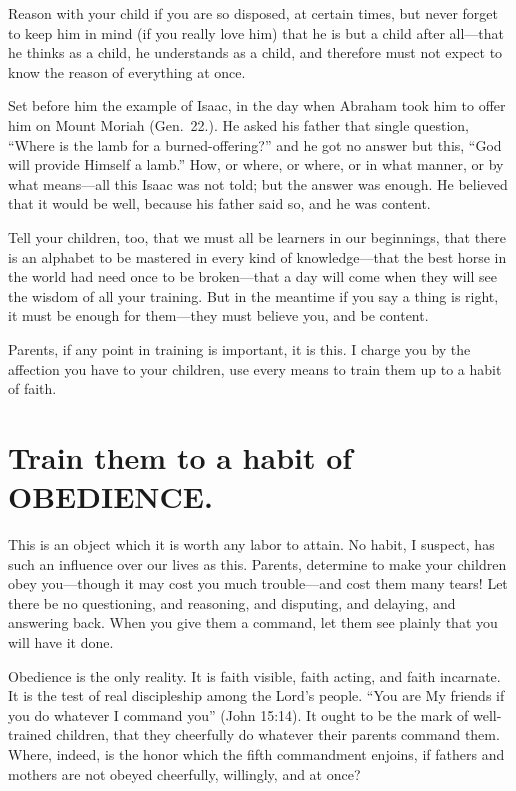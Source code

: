 \documentclass[
]{book}
\begin{document}
Reason with your child if you are so disposed, at certain times, but never forget to keep him in mind (if you really love him) that he is but a child after all---that he thinks as a child, he understands as a child, and therefore must not expect to know the reason of everything at once.

Set before him the example of Isaac, in the day when Abraham took him to offer him on Mount Moriah (Gen.~22.). He asked his father that single question, ``Where is the lamb for a burned-offering?'' and he got no answer but this, ``God will provide Himself a lamb.'' How, or where, or where, or in what manner, or by what means---all this Isaac was not told; but the answer was enough. He believed that it would be well, because his father said so, and he was content.

Tell your children, too, that we must all be learners in our beginnings, that there is an alphabet to be mastered in every kind of knowledge---that the best horse in the world had need once to be broken---that a day will come when they will see the wisdom of all your training. But in the meantime if you say a thing is right, it must be enough for them---they must believe you, and be content.

Parents, if any point in training is important, it is this. I charge you by the affection you have to your children, use every means to train them up to a habit of faith.

\hypertarget{train-them-to-a-habit-of-obedience.}{%
\chapter{Train them to a habit of OBEDIENCE.}\label{train-them-to-a-habit-of-obedience.}}

This is an object which it is worth any labor to attain. No habit, I suspect, has such an influence over our lives as this. Parents, determine to make your children obey you---though it may cost you much trouble---and cost them many tears! Let there be no questioning, and reasoning, and disputing, and delaying, and answering back. When you give them a command, let them see plainly that you will have it done.

Obedience is the only reality. It is faith visible, faith acting, and faith incarnate. It is the test of real discipleship among the Lord's people. ``You are My friends if you do whatever I command you'' (John 15:14). It ought to be the mark of well-trained children, that they cheerfully do whatever their parents command them. Where, indeed, is the honor which the fifth commandment enjoins, if fathers and mothers are not obeyed cheerfully, willingly, and at once?
\end{document}
